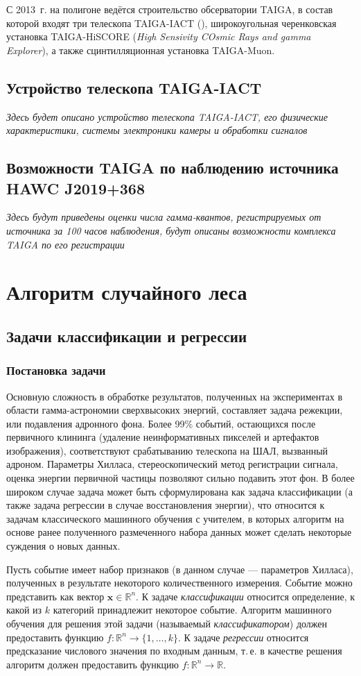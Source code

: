 \documentclass[magd,floatypics,numeref]{msudipl} %
\begin{document}
С 2013~г. на полигоне ведётся строительство обсерватории TAIGA, в состав которой входят три телескопа TAIGA-IACT (), широкоугольная черенковская установка TAIGA-HiSCORE (\textit{High Sensivity COsmic Rays and gamma Explorer}), а также сцинтилляционная установка TAIGA-Muon.
\section{Устройство телескопа TAIGA-IACT}
\textit{
Здесь будет описано устройство телескопа TAIGA-IACT, его физические характеристики, системы электроники камеры и обработки сигналов
}
\section{Возможности TAIGA по наблюдению источника HAWC J2019+368}
\textit{
Здесь будут приведены оценки числа гамма-квантов, регистрируемых от источника за 100 часов наблюдения, будут описаны возможности комплекса TAIGA по его регистрации
}
\chapter{Алгоритм случайного леса}
\section{Задачи классификации и регрессии}
\subsection{Постановка задачи}
Основную сложность в обработке результатов, полученных на экспериментах в области гамма-астрономии сверхвысоких энергий, составляет задача режекции, или подавления адронного фона. Более 99\% событий, остающихся после первичного клининга (удаление неинформативных пикселей и артефактов изображения), соответствуют срабатыванию телескопа на ШАЛ, вызванный адроном. Параметры Хилласа, стереоскопический метод регистрации сигнала, оценка энергии первичной частицы позволяют сильно подавить этот фон. В более широком случае задача может быть сформулирована как задача классификации (а также задача регрессии в случае восстановления энергии), что относится к задачам классического машинного обучения с учителем, в которых алгоритм на основе ранее полученного размеченного набора данных может сделать некоторые суждения о новых данных. 

Пусть событие имеет набор признаков (в данном случае --- параметров Хилласа), полученных в результате некоторого количественного измерения. Событие можно представить как вектор 
$\mathbf{x}\in \mathds{R}^n$. К задаче \textit{классификации} относится определение, к какой из $k$ категорий принадлежит некоторое событие. Алгоритм машинного обучения для решения этой задачи (называемый \textit{классификатором}) должен предоставить функцию $f: \mathds{R}^n \rightarrow \{ 1, \dots, k\}$. К задаче \textit{регрессии} относится предсказание числового значения по входным данным, т.\,е. в качестве решения алгоритм должен предоставить функцию $f: \mathds{R}^n \rightarrow  \mathds{R}$. 
\end{document}
